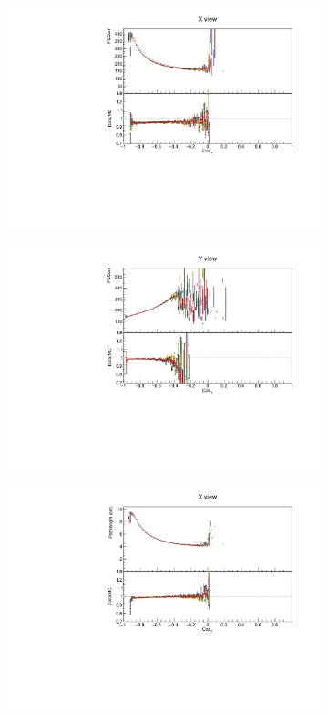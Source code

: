 \begin{figure}[!ht]
\begin{subfigure}{0.5\textwidth}
  \end{subfigure}
  \begin{subfigure}{0.5\textwidth}
    \includegraphics[width=\linewidth]{PlotsAngularDistribution/pecorr_cosy_x.pdf}
  \end{subfigure}
  \begin{subfigure}{0.5\textwidth}
    \includegraphics[width=\linewidth]{PlotsAngularDistribution/pecorr_cosy_y.pdf}
  \end{subfigure}
  \begin{subfigure}{0.5\textwidth}
    \includegraphics[width=\linewidth]{PlotsAngularDistribution/cm_cosy_x.pdf}

\end{subfigure}
\end{figure}
